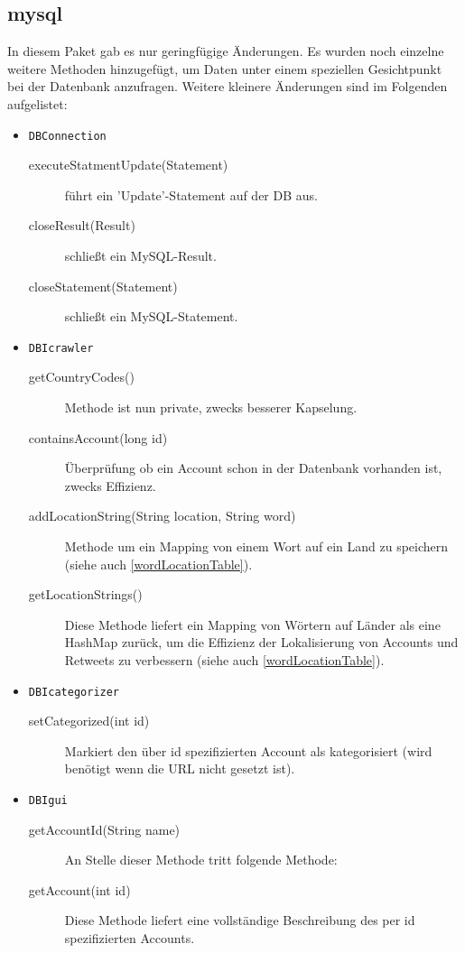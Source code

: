 \subsection{mysql}
In diesem Paket gab es nur geringfügige Änderungen. Es wurden noch einzelne weitere Methoden hinzugefügt, um Daten unter einem speziellen Gesichtpunkt bei der Datenbank anzufragen. Weitere kleinere Änderungen sind im Folgenden aufgelistet:
\begin{itemize}
	\item \lstinline{DBConnection}
	\begin{description}
		\item[executeStatmentUpdate(Statement)] führt ein 'Update'-Statement auf der DB aus.
		\item[closeResult(Result)] schließt ein MySQL-Result.
		\item[closeStatement(Statement)] schließt ein MySQL-Statement.
	\end{description}
			\item \lstinline{DBIcrawler}
	\begin{description}
		\item[getCountryCodes()] Methode ist nun private, zwecks besserer Kapselung.
		\item[containsAccount(long id)] Überprüfung ob ein Account schon in der Datenbank vorhanden ist, zwecks Effizienz.	
		\item[addLocationString(String location, String word)] Methode um ein Mapping von einem Wort auf ein Land zu speichern (siehe auch \cref{wordLocationTable}).
		\item[getLocationStrings()] Diese Methode liefert ein Mapping von Wörtern auf Länder als eine HashMap zurück, um die Effizienz der Lokalisierung von Accounts und Retweets zu verbessern (siehe auch \cref{wordLocationTable}).
	\end{description}
		\item \lstinline{DBIcategorizer}
	\begin{description}
		\item[setCategorized(int id)] Markiert den über id spezifizierten Account als kategorisiert (wird benötigt wenn die URL nicht gesetzt ist).
	\end{description}
			\item \lstinline{DBIgui}
	\begin{description}
		\item[getAccountId(String name)] An Stelle dieser Methode tritt folgende Methode:
		\item[getAccount(int id)] Diese Methode liefert eine vollständige Beschreibung des per id spezifizierten Accounts.

\end{description}
\end{itemize}

